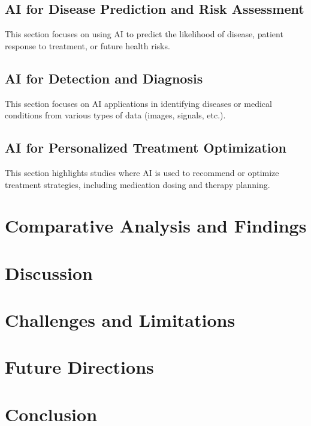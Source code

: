 \documentclass[runningheads]{llncs}
\begin{document}
\subsection{AI for Disease Prediction and Risk Assessment}
This section focuses on using AI to predict the likelihood of disease, patient response to treatment, or future health risks.


\subsection{AI for Detection and Diagnosis}

This section focuses on AI applications in identifying diseases or medical conditions from various types of data (images, signals, etc.).

\subsection{AI for Personalized Treatment Optimization}

This section highlights studies where AI is used to recommend or optimize treatment strategies, including medication dosing and therapy planning.

\section{Comparative Analysis and Findings}

\section{Discussion}

\section{Challenges and Limitations}

\section{Future Directions}

\section{Conclusion}



\end{document}
